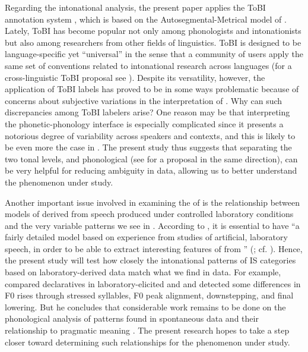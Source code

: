 \documentclass[output=paper]{langsci/langscibook}
\begin{document}
Regarding the intonational analysis, the present paper applies the  ToBI  annotation system \citep{Aguilar.2009}, which is based on the Autosegmental-Metrical model of  \citep{Pierrehumbert1980}. Lately, ToBI has become popular not only among phonologists and intonationists but also among researchers from other fields of linguistics. ToBI is designed to be language-specific yet ``universal'' in the sense that a community of users apply the same set of conventions related to intonational research across languages (for a cross-linguistic ToBI proposal see \citealt{Hualde2016}). Despite its versatility, however, the application of ToBI labels has proved to be in some ways problematic because of concerns about subjective variations in the interpretation of . Why can such discrepancies among ToBI labelers arise? One reason may be that interpreting the phonetic-phonology interface is especially complicated since it presents a notorious degree of variability across speakers and contexts, and this is likely to be even more the case in . The present study thus suggests that separating the two tonal levels,  and phonological (see \citealt{Hualde2016} for a proposal in the same direction), can be very helpful for reducing ambiguity in  data, allowing us to better understand the phenomenon under study. 

Another important issue involved in examining the  of  is the relationship between models of  derived from speech produced under controlled laboratory conditions and the very variable patterns we see in . According to \citet[37]{Bruce1990}, it is essential to have ``a fairly detailed model based on experience from studies of artificial, laboratory speech, in order to be able to extract interesting features of  from '' (\citealt[37]{Bruce1990}; cf. \citealt{Face2003}). Hence, the present study will test how closely the intonational patterns of IS categories based on laboratory-derived data match what we find in  data. For example, \citet{Face2003} compared  declaratives in laboratory-elicited and  and detected some  differences in F0 rises through stressed syllables, F0 peak alignment, downstepping, and final lowering. But he concludes that considerable work remains to be done on the phonological analysis of  patterns found in spontaneous data and their relationship to pragmatic meaning \citep[129]{Face2003}. The present research hopes to take a step closer toward determining such relationships for the phenomenon under study.
\end{document}
